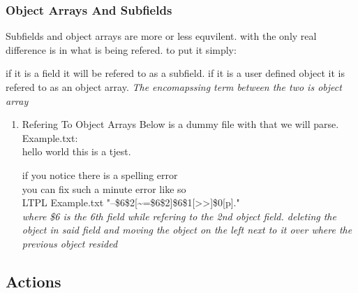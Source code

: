 \documentclass[11pt]{article}
\begin{document}
\subsubsection{Object Arrays And Subfields}
\label{sec:orgc48c678}
Subfields and object arrays are more or less equvilent. with the only real difference is in what is being refered. to put it simply:

if it is a field it will be refered to as a subfield.
if it is a user defined object it is refered to as an object array.
\emph{The encomapssing term between the two is object array}
\begin{enumerate}
\item Refering To  Object Arrays
\label{sec:orgb6161ce}
Below is a dummy file with that we will parse.\\

Example.txt:\\
hello world this is a tjest.

if you notice there is a spelling error\\
you can fix such a minute error like so\\

LTPL Example.txt "--\$6\$2[\textasciitilde{}=\$6\$2]\$6\$1[>>]\$0[p]."\\
\emph{where \$6 is the 6th field while refering to the 2nd object field. deleting the object in said field and moving the object on the left next to it over where the previous object resided}
\end{enumerate}

\subsection{Actions}
\label{sec:orgc5d8f11}
\end{document}
